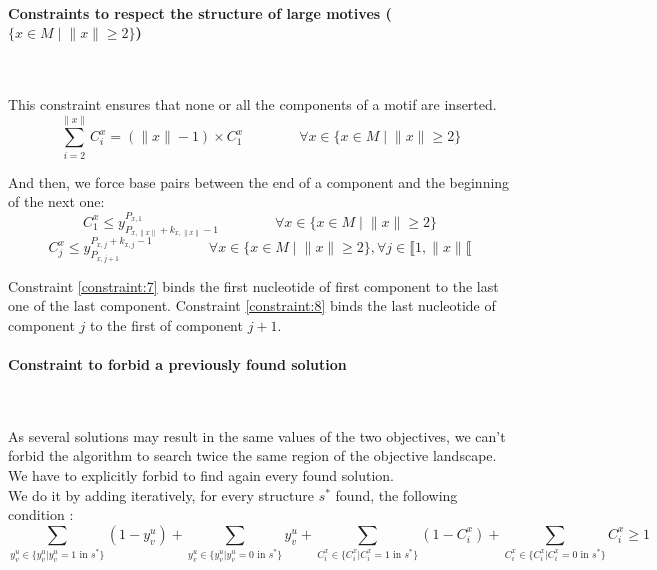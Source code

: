 \documentclass{article}
\begin{document}
\paragraph{Constraints to respect the structure of large motives ($\{ x\in M \; | \; \|x\| \geq 2\}$)} ~ 

This constraint ensures that none or all the components of a motif are inserted.
\begin{equation}\label{constraint:6}
	\sum_{i=2}^{\|x\|} C^x_i = (\|x\| - 1) \times C^{x}_{1}	 \qquad \qquad \forall x \in \{ x\in M \; | \; \|x\| \geq 2\}
\end{equation}

And then, we force base pairs between the end of a component and the beginning of the next one:
\begin{equation}\label{constraint:7}
	C^x_1 \leq y^{P_{x,1}}_{P_{x,\|x\|}+k_{x,\|x\|}-1} \qquad \qquad \forall x \in \{ x\in M \; | \; \|x\| \geq 2\}
\end{equation}
\begin{equation}\label{constraint:8}
	C^x_j \leq y^{P_{x,j}+k_{x,j}-1}_{P_{x,j+1}} \qquad \qquad \forall x \in \{ x\in M \; | \; \|x\| \geq 2\}, \forall j \in \llbracket 1,\|x\| \llbracket
\end{equation}

Constraint \ref{constraint:7} binds the first nucleotide of first component to the last one of the last component. 
Constraint \ref{constraint:8} binds the last nucleotide of component $j$ to the first of component $j+1$.

\paragraph{Constraint to forbid a previously found solution} ~ 

As several solutions may result in the same values of the two objectives, we can't forbid the algorithm to search twice the same region of the objective landscape.
We have to explicitly forbid to find again every found solution.\\
We do it by adding iteratively, for every structure $s^*$ found, the following condition :
\begin{equation}\label{constraint:9}
	\sum_{y^u_v \in \{ y^u_v  | y^u_v = 1 \text{ in } s^* \}} (1 - y^u_v) + \sum_{y^u_v \in \{ y^u_v  | y^u_v = 0 \text{ in } s^* \}} y^u_v +
	\sum_{C^x_i \in \{ C^x_i  | C^x_i = 1 \text{ in } s^* \}} (1 - C^x_i) + \sum_{C^x_i \in \{ C^x_i  |C^x_i = 0 \text{ in } s^* \}} C^x_i \geq 1
\end{equation}
\end{document}

